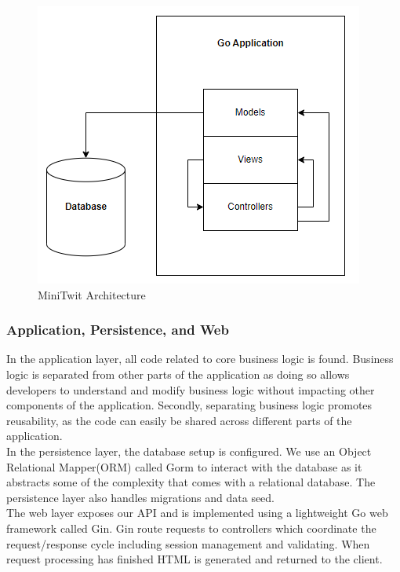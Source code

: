 \begin{figure}[H]
    \centering
    \captionsetup{justification=centering,margin=1cm}
    \includegraphics[width=0.8\linewidth]{report/images/system_architecture.png}
    \caption{MiniTwit Architecture}
    \label{fig:minitwit}
\end{figure}



\subsubsection{Application, Persistence, and Web}
In the application layer, all code related to core business logic is found. 
Business logic is separated from other parts of the application as doing so allows developers to understand and modify business logic without impacting other components of the application. 
Secondly, separating business logic promotes reusability, as the code can easily be shared across different parts of the application. \\

In the persistence layer, the database setup is configured. We use an Object Relational Mapper(ORM) called Gorm to interact with the database as it abstracts some of the complexity that comes with a relational database. 
The persistence layer also handles migrations and data seed. \\

The web layer exposes our API and is implemented using a lightweight Go web framework called Gin.  
Gin route requests to controllers which coordinate the request/response cycle including session management and validating. 
When request processing has finished HTML is generated and returned to the client.


